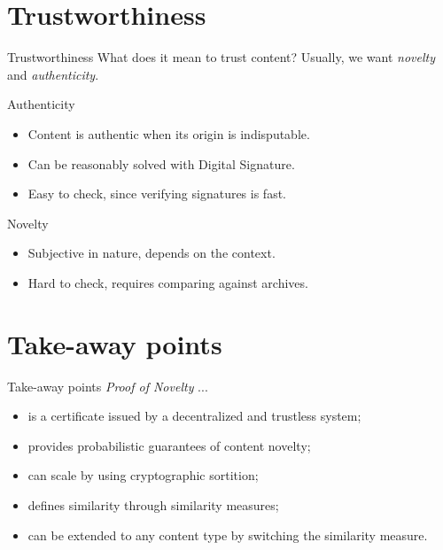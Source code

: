 \documentclass{beamer}
\begin{document}
\section{Trustworthiness}
\begin{frame}{Trustworthiness}
    What does it mean to trust content? \pause Usually, we want \emph{novelty} and \emph{authenticity}.
    
    \vfill
    \pause
    \begin{block}{Authenticity}
        \begin{itemize}
            \item Content is authentic when its origin is indisputable.\pause
            \item Can be reasonably solved with Digital Signature.\pause
            \item Easy to check, since verifying signatures is fast.
        \end{itemize}
    \end{block}
    
    \vfill
    
    \pause
    \begin{block}{Novelty}
        \begin{itemize}
            \item Subjective in nature, depends on the context.\pause
            \item Hard to check, requires comparing against archives.
        \end{itemize}
    \end{block}
    
\end{frame}

\section{Take-away points}
\begin{frame}{Take-away points}
    \emph{Proof of Novelty} ...
    \begin{itemize}
        \item is a certificate issued by a decentralized and trustless system;\pause
        \item provides probabilistic guarantees of content novelty;\pause
        \item can scale by using cryptographic sortition;\pause
        \item defines similarity through similarity measures;\pause
        \item can be extended to any content type by switching the similarity measure.
    \end{itemize}
\end{frame}
\end{document}
